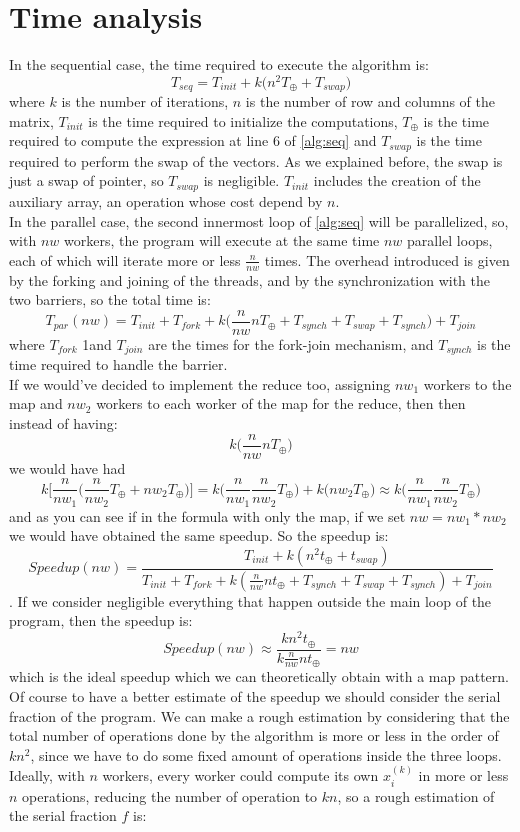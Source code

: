 \documentclass[12pt]{article}
\begin{document}
	\section{Time analysis}
	In the sequential case, the time required to execute the algorithm is:
	\[ T_{seq} = T_{init} + k\Big(n^2T_\oplus + T_{swap}\Big) \]
	where $k$ is the number of iterations, $n$ is the number of row and columns of the matrix, $T_{init}$ is the time required to initialize the computations, $T_\oplus$ is the time required to compute the expression at line 6 of \ref{alg:seq} and $T_{swap}$ is the time required to perform the swap of the vectors. As we explained before, the swap is just a swap of pointer, so $T_{swap}$ is negligible. $T_{init}$ includes the creation of the auxiliary array, an operation whose cost depend by $n$. \\
	In the parallel case, the second innermost loop of \ref{alg:seq} will be parallelized, so, with $nw$ workers, the program will execute at the same time $nw$ parallel loops, each of which will iterate more or less $\frac{n}{nw}$ times. The overhead introduced is given by the forking and joining of the threads, and by the synchronization with the two barriers, so the total time is:
	\[T_{par}(nw) = T_{init} + T_{fork} + k\Big(\frac{n}{nw}nT_\oplus + T_{synch} + T_{swap} + T_{synch}\Big) + T_{join} \]
	where $T_{fork}$ 1and $T_{join}$ are the times for the fork-join mechanism, and $T_{synch}$ is the time required to handle the barrier.  \\
	If we would've decided to implement the reduce too, assigning $nw_1$ workers to the map and $nw_2$ workers to each worker of the map for the reduce, then then instead of having:
	\[ k\Big(\frac{n}{nw}nT_\oplus\Big)\]
	we would have had 
	\[ k\Big[\frac{n}{nw_1}\Big(\frac{n}{nw_2}T_\oplus + nw_2T_\oplus \Big) \Big] = k\Big(\frac{n}{nw_1}\frac{n}{nw_2}T_\oplus\Big) + k\Big(nw_2T_\oplus\Big) \approx k\Big(\frac{n}{nw_1}\frac{n}{nw_2}T_\oplus\Big)\]
	and as you can see if in the formula with only the map, if we set $nw = nw_1*nw_2$ we would have obtained the same speedup. So the speedup is:
	\[ Speedup(nw) = \frac{T_{init} + k(n^2t_\oplus + t_{swap})}{T_{init} + T_{fork} + k(\frac{n}{nw}nt_\oplus + T_{synch} + T_{swap} + T_{synch}) + T_{join}}\].
	If we consider negligible everything that happen outside the main loop of the program, then the speedup is:
	\[ Speedup(nw) \approx \frac{kn^2t_\oplus}{k\frac{n}{nw}nt_\oplus} = nw\]
	which is the ideal speedup which we can theoretically obtain with a map pattern. Of course to have a better estimate of the speedup we should consider the serial fraction of the program. We can make a rough estimation by considering that the total number of operations done by the algorithm is more or less in the order of $kn^2$, since we have to do some fixed amount of operations inside the three loops. Ideally, with $n$ workers, every worker could compute its own $x_i^{(k)}$ in more or less $n$ operations, reducing the number of operation to $kn$, so a rough estimation of the serial fraction $f$ is: 
\end{document}
